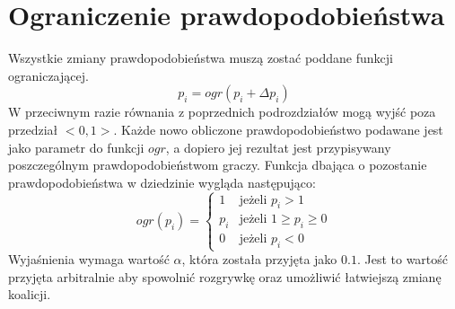 \section{Ograniczenie prawdopodobieństwa}
\label{sec:ograniczenie}
Wszystkie zmiany prawdopodobieństwa muszą zostać poddane funkcji ograniczającej.
\begin{equation} \label{eq:ograniczenie}
p_i = ogr( p_i + \Delta p_i)
\end{equation}
W przeciwnym razie równania z poprzednich podrozdziałów mogą wyjść poza przedział $<0,1>$. Każde nowo obliczone prawdopodobieństwo podawane jest jako parametr do funkcji $ogr$, a dopiero jej rezultat jest przypisywany poszczególnym prawdopodobieństwom graczy. Funkcja dbająca o pozostanie prawdopodobieństwa w dziedzinie wygląda następująco:
\begin{displaymath}
ogr(p_i) = \left\{
\begin{array}{ll}
1 & \text{jeżeli } p_i > 1 \\
p_i & \text{jeżeli } 1 \geq p_i \geq 0 \\
0 & \text{jeżeli } p_i < 0
\end{array} 
\right.
\end{displaymath}
Wyjaśnienia wymaga wartość $\alpha$, która została przyjęta jako $0.1$. Jest to wartość przyjęta arbitralnie aby spowolnić rozgrywkę oraz umożliwić łatwiejszą zmianę koalicji. 



